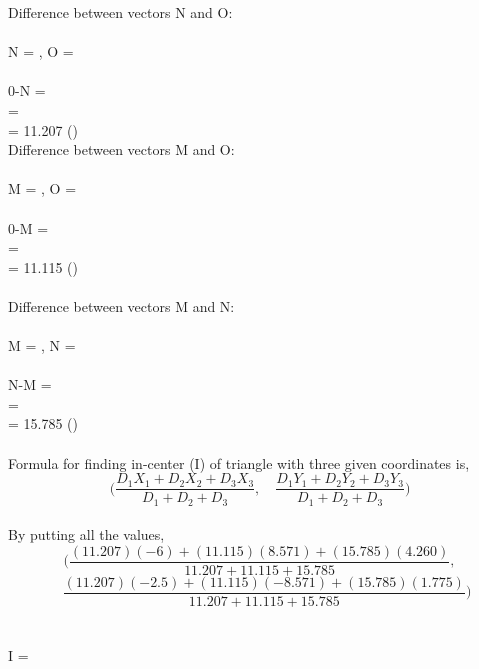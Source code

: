 \documentclass[journal,12pt,twocolumn]{IEEEtran}
\begin{document}
Difference between vectors N and O:\\
\\
N = , O = \\
\\
0-N = \\
 = \\
 = 11.207 \qquad\qquad ()\\

Difference between vectors M and O:\\
\\
M = , O = \\
\\
0-M = \\
 = \\
 = 11.115 \qquad\qquad ()\\
\\

Difference between vectors M and N:\\
\\
M = , N = \\
\\
N-M = \\
 = \\
 = 15.785 \qquad\qquad ()\\
\\

Formula for finding in-center (I) of triangle with three given coordinates is,\\
$$ \bigg(\frac{D_1X_1 + D_2X_2 + D_3X_3}{D_1+D_2+D_3} ,\quad\frac{D_1Y_1 + D_2Y_2 + D_3Y_3}{D_1+D_2+D_3}\bigg) $$
\\
By putting all the values,\\
$$ \bigg(\frac{(11.207)(-6) + (11.115)(8.571) + (15.785)(4.260)}{11.207+11.115+15.785} ,$$
$$\quad\frac{(11.207)(-2.5) + (11.115)(-8.571) + (15.785)(1.775)}{11.207+11.115+15.785}\bigg) $$
\\ \\
I = 
\end{document}

